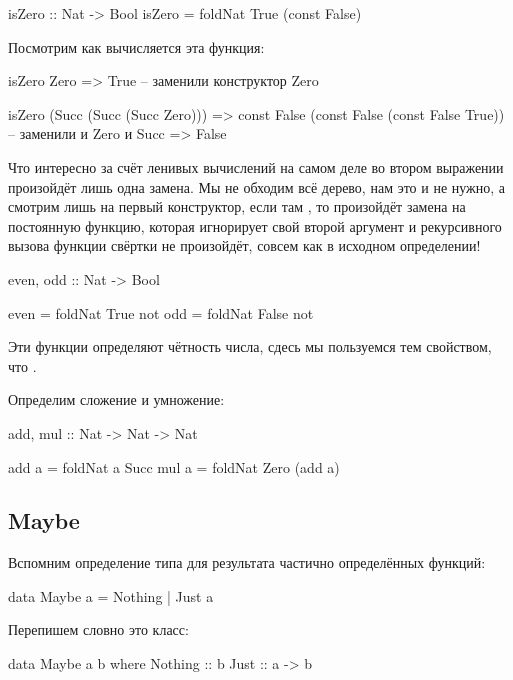 \begin{code}
isZero :: Nat -> Bool
isZero = foldNat True (const False)
\end{code}

Посмотрим как вычисляется эта функция:

\begin{code}
        isZero Zero
=>      True            -- заменили конструктор Zero

        isZero (Succ (Succ (Succ Zero)))
=>      const False (const False (const False True))
                        -- заменили и Zero и Succ
=>      False
\end{code}

Что интересно за счёт ленивых вычислений на самом деле
во втором выражении произойдёт лишь одна замена.
Мы не обходим всё дерево, нам это и не нужно, а смотрим
лишь на первый конструктор, если там , то
произойдёт замена на постоянную функцию, которая игнорирует
свой второй аргумент и рекурсивного вызова функции свёртки
не произойдёт, совсем как в исходном определении! 


\begin{code}
even, odd :: Nat -> Bool

even    = foldNat True  not
odd     = foldNat False not
\end{code}

Эти функции определяют чётность числа, сдесь
мы пользуемся тем свойством, что .

Определим сложение и умножение:

\begin{code}
add, mul :: Nat -> Nat -> Nat

add a  = foldNat a     Succ
mul a  = foldNat Zero  (add a)
\end{code}


\subsection{Maybe}

Вспомним определение типа для результата частично
определённых функций:

\begin{code}
data Maybe a = Nothing | Just a
\end{code}

Перепишем словно это класс:

\begin{code}
data Maybe a b where
    Nothing :: b
    Just    :: a -> b
\end{code}

